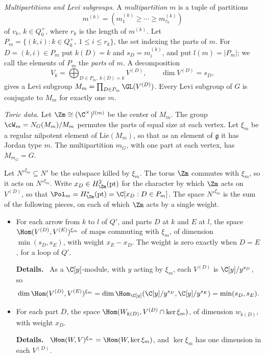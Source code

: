 \documentclass[11pt]{amsart}
\newenvironment{details}{\par\color{black!60!green}\noindent\textbf{Details.}\ }{\par}
\begin{document}
\emph{Multipartitions and Levi subgroups.}  A \emph{multipartition} $m$ is
a tuple of partitions
\[
 m^{(k)}=(m^{(k)}_1\ge\cdots\ge m^{(k)}_{r_k})
\]
of $v_k$, $k\in Q_0^+$, where $r_k$ is the length of $m^{(k)}$.  Let
$P_m=\{(k,i):k\in Q_0^+,\ 1\le i\le r_k\}$, the set indexing the parts of $m$.  For $D=(k,i)\in P_m$ put $k(D)=k$ and
$s_D=m^{(k)}_i$, and put $l(m)=|P_m|$; we call the elements of $P_m$ the
\emph{parts} of $m$.
A decomposition
\[
 V_k=\bigoplus_{D\in P_m,\ k(D)=k}V^{(D)},\qquad \dim V^{(D)}=s_D,
\]
gives a Levi subgroup $M_m=\prod_{D\in P_m}\GL(V^{(D)})$.
Every Levi subgroup of $G$ is conjugate to $M_m$ for exactly one $m$.  

\emph{Toric data.}  Let
$\Zm\cong(\C^\times)^{l(m)}$ be the center of $M_m$.  The group
$\cW_m=N_G(M_m)/M_m$ permutes the parts of equal size at each vertex.  Let
$\xi_m$ be a regular nilpotent element of $\mathrm{Lie}(M_m)$, so that as an
element of $\mathfrak g$ it has Jordan type $m$.  The multipartition $m_G$,
with one part at each vertex, has $M_{m_G}=G$.

Let $N'^{\xi_m}\subseteq N'$ be the subspace killed by $\xi_m$.  The torus
$\Zm$ commutes with $\xi_m$, so it acts on $N'^{\xi_m}$.  Write
$x_D\in H^2_{\Zm}(\mathrm{pt})$ for the character by which $\Zm$ acts on
$V^{(D)}$, so that $\Pol_m=H^*_{\Zm}(\mathrm{pt})=\C[x_D:D\in P_m]$.  The space
$N'^{\xi_m}$ is the sum of the following pieces, on each of which $\Zm$ acts
by a single weight.
\begin{itemize}[leftmargin=2em]
\item For each arrow from $k$ to $l$ of $Q'$, and parts $D$ at $k$ and $E$ at
$l$, the space $\Hom(V^{(D)},V^{(E)})^{\xi_m}$ of maps commuting with
$\xi_m$, of dimension $\min(s_D,s_E)$, with weight $x_E-x_D$.  The weight is
zero exactly when $D=E$, for a loop of $Q'$.
\begin{details}
As a $\C[y]$-module, with $y$ acting by
$\xi_m$, each $V^{(D)}$ is $\C[y]/y^{s_D}$, so
\[
 \dim \Hom(V^{(D)},V^{(E)})^{\xi_m}=\dim \Hom_{\C[y]}(\C[y]/y^{s_D},\C[y]/y^{s_E})=\min(s_D,s_E).
\]
\end{details}
\item For each part $D$, the space $\Hom(W_{k(D)},V^{(D)}\cap\ker\xi_m)$, of
dimension $w_{k(D)}$, with weight $x_D$.
\begin{details}
$\Hom(W,V)^{\xi_m}=\Hom(W,\ker\xi_m)$, and $\ker\xi_m$ has one dimension in
each $V^{(D)}$.
\end{details}
\end{itemize}
\end{document}
